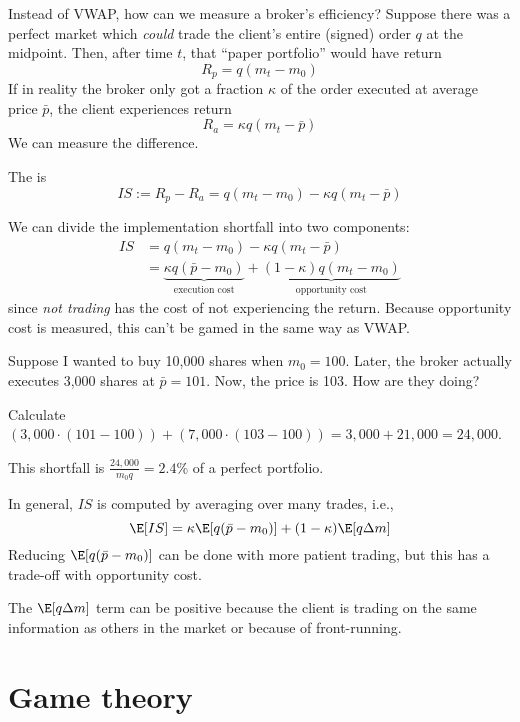 \documentclass[class=bu430,notes,tikz]{agony}
\begin{document}
Instead of VWAP, how can we measure a broker's efficiency?
Suppose there was a perfect market which \emph{could} trade the client's
entire (signed) order $q$ at the midpoint.
Then, after time $t$, that ``paper portfolio'' would have return
\[ R_p = q(m_t - m_0) \]
If in reality the broker only got a fraction $\kappa$ of the order
executed at average price $\bar p$, the client experiences return
\[ R_a = \kappa q(m_t - \bar p) \]
We can measure the difference.

\begin{defn}
  The  is
  \[ IS := R_p - R_a = q(m_t - m_0) - \kappa q(m_t - \bar p) \]
\end{defn}

We can divide the implementation shortfall into two components:
\begin{align*}
  IS & = q(m_t - m_0) - \kappa q(m_t - \bar p)                                                                                         \\
     & = \underbrace{\kappa q(\bar p - m_0)}_{\text{execution cost}} + \underbrace{(1-\kappa) q (m_t - m_0)}_{\text{opportunity cost}}
\end{align*}
since \emph{not trading} has the cost of not experiencing the return.
Because opportunity cost is measured, this can't be gamed in the same way as VWAP.

\begin{example}
  Suppose I wanted to buy 10,000 shares when $m_0 = 100$.
  Later, the broker actually executes 3,000 shares at $\bar p = 101$.
  Now, the price is 103.
  How are they doing?
\end{example}
\begin{sol}
  Calculate $(3,000 \cdot (101 - 100)) + (7,000\cdot (103-100)) = 3,000 + 21,000 = 24,000$.

  This shortfall is $\frac{24,000}{m_0 q} = 2.4\%$ of a perfect portfolio.
\end{sol}

In general, $IS$ is computed by averaging over many trades, i.e.,
\[ \E[IS] = \kappa\E[q(\bar p - m_0)] + (1-\kappa)\E[q\Delta m] \]
Reducing $\E[q(\bar p-m_0)]$ can be done with more patient trading,
but this has a trade-off with opportunity cost.

The $\E[q\Delta m]$ term can be positive because the client is trading
on the same information as others in the market or because of front-running.

\chapter{Game theory}
\end{document}
